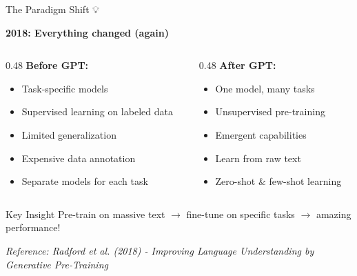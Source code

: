 \documentclass[aspectratio=169]{beamer}
\begin{document}
\begin{frame}{The Paradigm Shift 💡}
\begin{center}
\LARGE
\textbf{2018: Everything changed (again)}
\end{center}

\vspace{1em}

\begin{columns}[T]
\begin{column}{0.48\textwidth}
\textbf{Before GPT:}
\begin{itemize}
    \item Task-specific models
    \item Supervised learning on labeled data
    \item Limited generalization
    \item Expensive data annotation
    \item Separate models for each task
\end{itemize}
\end{column}

\begin{column}{0.48\textwidth}
\textbf{After GPT:}
\begin{itemize}
    \item One model, many tasks
    \item Unsupervised pre-training
    \item Emergent capabilities
    \item Learn from raw text
    \item \alert{Zero-shot \& few-shot learning}
\end{itemize}
\end{column}
\end{columns}

\vspace{1em}

\begin{alertblock}{Key Insight}
Pre-train on massive text $\rightarrow$ fine-tune on specific tasks $\rightarrow$ amazing performance!
\end{alertblock}

\small
\textit{Reference: Radford et al. (2018) - Improving Language Understanding by Generative Pre-Training}
\end{frame}
\end{document}
